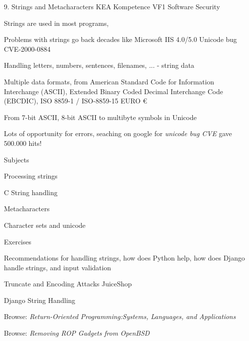 \documentclass[Screen16to9,17pt]{foils}
\begin{document}
\mytitlepage
{9. Strings and Metacharacters}
{KEA Kompetence VF1 Software Security}



\begin{list1}
\item Strings are used in most programs,
\item Problems with strings go back decades like Microsoft IIS 4.0/5.0 Unicode bug CVE-2000-0884
\item Handling letters, numbers, sentences, filenames, ... - string data
\item Multiple data formats, from American Standard Code for Information Interchange (ASCII), Extended Binary Coded Decimal Interchange Code (EBCDIC), ISO 8859-1 / ISO-8859-15 EURO €
\item From 7-bit ASCII, 8-bit ASCII to multibyte symbols in Unicode
\item Lots of opportunity for errors, seaching on google for \emph{unicode bug CVE} gave 500.000 hits!
\end{list1}


\begin{list1}
\item Subjects
\begin{list2}
\item Processing strings
\item C String handling
\item Metacharacters
\item Character sets and unicode
\end{list2}
\item Exercises
\begin{list2}
\item Recommendations for handling strings, how does Python help, how does Django handle strings, and input validation
\item Truncate and Encoding Attacks JuiceShop
\item Django String Handling
\end{list2}
\end{list1}


\begin{list1}
\item Browse: \emph{Return-Oriented Programming:Systems, Languages, and Applications}
\item Browse: \emph{Removing ROP Gadgets from OpenBSD}
\end{list1}
\end{document}
